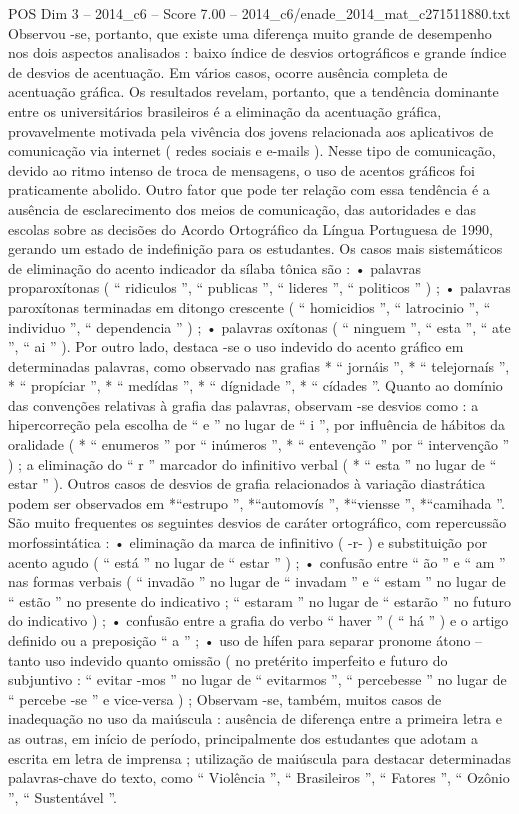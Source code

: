 \begin{textsample}{POS Dim 3 – 2014\_c6 – Score 7.00 – 2014\_c6/enade\_2014\_mat\_c271511880.txt}
Observou -se, portanto, que existe uma diferença muito grande de desempenho nos dois aspectos analisados : baixo índice de desvios ortográficos e grande índice de desvios de acentuação.
Em vários casos, ocorre ausência completa de acentuação gráfica.
Os resultados revelam, portanto, que a tendência dominante entre os universitários brasileiros é a eliminação da acentuação gráfica, provavelmente motivada pela vivência dos jovens relacionada aos aplicativos de comunicação via internet ( redes sociais e e-mails ).
Nesse tipo de comunicação, devido ao ritmo intenso de troca de mensagens, o uso de acentos gráficos foi praticamente abolido.
Outro fator que pode ter relação com essa tendência é a ausência de esclarecimento dos meios de comunicação, das autoridades e das escolas sobre as decisões do Acordo Ortográfico da Língua Portuguesa de 1990, gerando um estado de indefinição para os estudantes.
Os casos mais sistemáticos de eliminação do acento indicador da sílaba tônica são : • palavras proparoxítonas ( “ ridiculos ”, “ publicas ”, “ lideres ”, “ politicos ” ) ; • palavras paroxítonas terminadas em ditongo crescente ( “ homicidios ”, “ latrocinio ”, “ individuo ”, “ dependencia ” ) ; • palavras oxítonas ( “ ninguem ”, “ esta ”, “ ate ”, “ ai ” ).
Por outro lado, destaca -se o uso indevido do acento gráfico em determinadas palavras, como observado nas grafias * “ jornáis ”, * “ telejornaís ”, * “ propíciar ”, * “ medídas ”, * “ dígnidade ”, * “ cídades ”.
Quanto ao domínio das convenções relativas à grafia das palavras, observam -se desvios como : a hipercorreção pela escolha de “ e ” no lugar de “ i ”, por influência de hábitos da oralidade ( * “ enumeros ” por “ inúmeros ”, * “ entevenção ” por “ intervenção ” ) ; a eliminação do “ r ” marcador do infinitivo verbal ( * “ esta ” no lugar de “ estar ” ).
Outros casos de desvios de grafia relacionados à variação diastrática podem ser observados em *“estrupo ”, *“automovís ”, *“viensse ”, *“camihada ”.
São muito frequentes os seguintes desvios de caráter ortográfico, com repercussão morfossintática : • eliminação da marca de infinitivo ( -r- ) e substituição por acento agudo ( “ está ” no lugar de “ estar ” ) ; • confusão entre “ ão ” e “ am ” nas formas verbais ( “ invadão ” no lugar de “ invadam ” e “ estam ” no lugar de “ estão ” no presente do indicativo ; “ estaram ” no lugar de “ estarão ” no futuro do indicativo ) ; • confusão entre a grafia do verbo “ haver ” ( “ há ” ) e o artigo definido ou a preposição “ a ” ; • uso de hífen para separar pronome átono – tanto uso indevido quanto omissão ( no pretérito imperfeito e futuro do subjuntivo : “ evitar -mos ” no lugar de “ evitarmos ”, “ percebesse ” no lugar de “ percebe -se ” e vice-versa ) ; Observam -se, também, muitos casos de inadequação no uso da maiúscula : ausência de diferença entre a primeira letra e as outras, em início de período, principalmente dos estudantes que adotam a escrita em letra de imprensa ; utilização de maiúscula para destacar determinadas palavras-chave do texto, como “ Violência ”, “ Brasileiros ”, “ Fatores ”, “ Ozônio ”, “ Sustentável ”.

\end{textsample}
